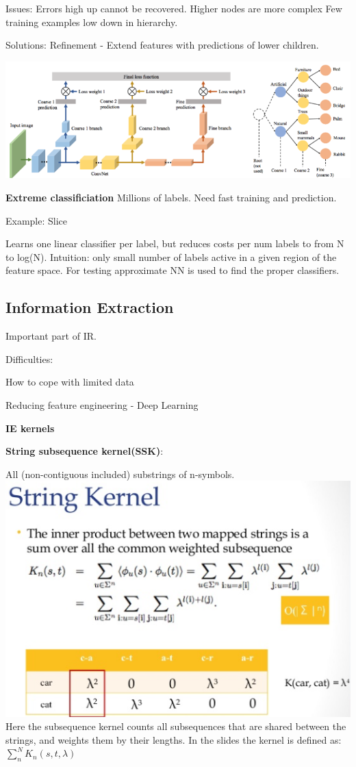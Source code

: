 \documentclass[a4paper,10pt,landscape]{article}
\newcommand{\topic}[1]{\begin{center}\section*{#1}\end{center}}
\begin{document}
\begin{multicols}{3}
 Issues:
 Errors high up cannot be recovered.
 Higher nodes are more complex
 Few training examples low down in hierarchy.
 
 Solutions:
 Refinement - Extend features with predictions of lower children.

\includegraphics[width=\linewidth]{images/CNN_hierarchy}

\textbf{Extreme classificiation}
Millions of labels. Need fast training and prediction.

 Example: Slice
 
 Learns one linear classifier per label, but reduces costs per num labels to from N to log(N). Intuition: only small number of labels active in a given region of the feature space. For testing approximate NN is used to find the proper classifiers.
 
 \topic{Information Extraction}
 Important part of IR.
 
 Difficulties:
 
 How to cope with limited data
 
 Reducing feature engineering - Deep Learning
 
 \textbf{IE kernels}
 
 \textbf{String subsequence kernel(SSK)}:
 
 All (non-contiguous included) substrings of n-symbols. 
 \includegraphics[width=\linewidth]{images/stringkernel.png}
 Here the subsequence kernel counts all subsequences that are shared between the strings, and weights them by their lengths. In the slides the kernel is defined as:
 $\sum_n^N K_n(s,t,\lambda)$
 

\end{multicols}
\end{document}
